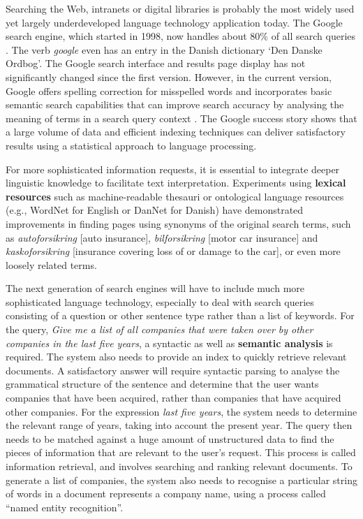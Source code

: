 \begin{multicols}{2}
Searching the Web, intranets or digital libraries is probably the most widely used yet largely underdeveloped language technology application today. The Google search engine, which started in 1998, now handles about 80\% of all search queries \cite{spi1}. The verb {\it google} even has an entry in the Danish dictionary `Den Danske Ordbog'. The Google search interface and results page display has not significantly changed since the first version. However, in the current version, Google offers spelling correction for misspelled words and incorporates basic semantic search capabilities that can improve search accuracy by analysing the meaning of terms in a search query context \cite{pc1}. The Google success story shows that a large volume of data and efficient indexing techniques can deliver satisfactory results using a statistical approach to language processing. 

For more sophisticated information requests, it is essential to integrate deeper linguistic knowledge to facilitate text interpretation. Experiments using \textbf{lexical resources} such as machine-readable thesauri or ontological language resources (e.g., WordNet for English or DanNet for Danish) have demonstrated improvements in finding pages using synonyms of the original search terms, such as \textit{autoforsikring} {[}auto insurance{]}, \textit{bilforsikring} {[}motor car insurance{]} and \textit{kaskoforsikring} {[}insurance covering loss of or damage to the car{]}, or even more loosely related terms.


The next generation of search engines will have to include much more sophisticated language technology, especially to deal with search queries consisting of a question or other sentence type rather than a list of keywords. For the query, \textit{Give me a list of all companies that were taken over by other companies in the last five years}, a syntactic as well as \textbf{semantic analysis} is required. The system also needs to provide an index to quickly retrieve relevant documents. A satisfactory answer will require syntactic parsing to analyse the grammatical structure of the sentence and determine that the user wants companies that have been acquired, rather than companies that have acquired other companies. For the expression \textit{last five years}, the system needs to determine the relevant range of years, taking into account the present year. The query then needs to be matched against a huge amount of unstructured data to find the pieces of information that are relevant to the user’s request. This process is called information retrieval, and involves searching and ranking relevant documents. To generate a list of companies, the system also needs to recognise a particular string of words in a document represents a company name, using a process called ``named entity recognition''.


\end{multicols}
